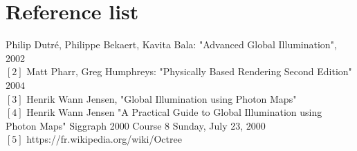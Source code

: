 \documentclass[12pt]{article}
\numberwithin{equation}{section}
\begin{document}
\section{Reference list}
\noindent [1] Philip Dutr\'e, Philippe Bekaert, Kavita Bala: "Advanced Global Illumination", 2002\\
$[2]$ Matt Pharr, Greg Humphreys: "Physically Based Rendering Second Edition" $2004$\\
$[3]$ Henrik Wann Jensen, "Global Illumination using Photon Maps" \\
$[4]$ Henrik Wann Jensen "A Practical Guide to Global Illumination using Photon Maps" Siggraph 2000 Course 8 Sunday, July 23, $2000$\\
$[5]$ https://fr.wikipedia.org/wiki/Octree\\


\nocite{*}


\end{document}

